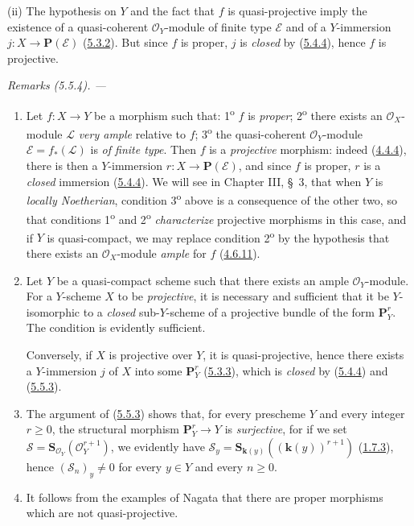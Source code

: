 (ii) The hypothesis on $Y$ and the fact that $f$ is quasi-projective imply
the existence of a quasi-coherent $\mathcal{O}_Y$-module of finite type
$\mathcal{E}$ and of a $Y$-immersion $j:X\to\mathbf{P}(\mathcal{E})$
(\hyperref[II.5.3.2]{5.3.2}). But since $f$ is proper, $j$ is \emph{closed} by
(\hyperref[II.5.4.4]{5.4.4}), hence $f$ is projective.

\par\medskip\noindent\textit{Remarks (5.5.4). ---\ }
\begin{enumerate}
  \item[\rm{(i)}] Let $f:X\to Y$ be a morphism such that:
  1\textsuperscript{o} $f$ is \emph{proper}; 2\textsuperscript{o} there exists an
  $\mathcal{O}_X$-module $\mathcal{L}$ \emph{very ample} relative to $f$;
  3\textsuperscript{o} the quasi-coherent $\mathcal{O}_Y$-module
  $\mathcal{E}=f_*(\mathcal{L})$ is \emph{of finite type}. Then $f$ is a \emph{projective}
  morphism: indeed (\hyperref[II.4.4.4]{4.4.4}), there is then a
  $Y$-immersion $r:X\to\mathbf{P}(\mathcal{E})$, and since $f$ is proper, $r$
  is a \emph{closed} immersion (\hyperref[II.5.4.4]{5.4.4}). We will see in
  Chapter III, \S~3, that when $Y$ is \emph{locally Noetherian}, condition
  3\textsuperscript{o} above is a consequence of the other two, so that
  conditions 1\textsuperscript{o} and 2\textsuperscript{o} \emph{characterize}
  projective morphisms in this case, and if $Y$ is quasi-compact, we may
  replace condition 2\textsuperscript{o} by the hypothesis that there exists
  an $\mathcal{O}_X$-module \emph{ample} for $f$
  (\hyperref[II.4.6.11]{4.6.11}).
  \item[\rm{(ii)}] Let $Y$ be a quasi-compact scheme such that there exists
  an ample $\mathcal{O}_Y$-module. For a $Y$-scheme $X$ to be \emph{projective}, it
  is necessary and sufficient that it be $Y$-isomorphic to a \emph{closed}
  sub-$Y$-scheme of a projective bundle of the form $\mathbf{P}_Y^r$. The
  condition is evidently sufficient.


  Conversely, if $X$ is projective over $Y$, it is quasi-projective, hence
  there exists a $Y$-immersion $j$ of $X$ into some $\mathbf{P}_Y^r$
  (\hyperref[II.5.3.3]{5.3.3}), which is \emph{closed} by
  (\hyperref[II.5.4.4]{5.4.4}) and
  (\hyperref[II.5.5.3]{5.5.3}).
  \item[\rm{(iii)}] The argument of
  (\hyperref[II.5.5.3]{5.5.3}) shows that, for every prescheme $Y$ and
  every integer $r\geq0$, the structural morphism $\mathbf{P}_Y^r\to Y$ is
  \emph{surjective}, for if we set
  $\mathcal{S}=\mathbf{S}_{\mathcal{O}_Y}(\mathcal{O}_Y^{r+1})$, we
  evidently have $\mathcal{S}_y=\mathbf{S}_{\boldsymbol{k}(y)}((\boldsymbol{k}(y))^{r+1})$
  (\hyperref[II.1.7.3]{1.7.3}), hence $(\mathcal{S}_n)_y\neq0$ for every
  $y\in Y$ and every $n\geq0$.
  \item[\rm{(iv)}] It follows from the examples of Nagata \cite{II-26} that
  there are proper morphisms which are not quasi-projective.
\end{enumerate}

